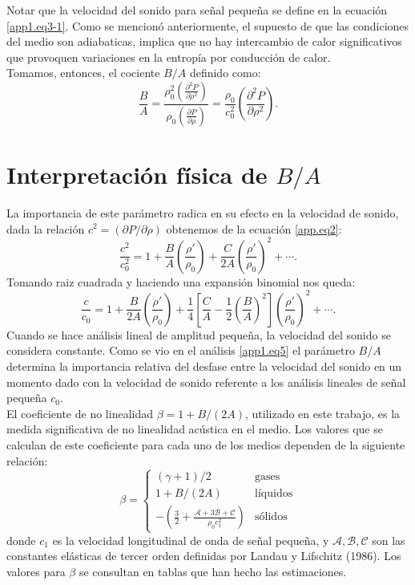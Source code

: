 Notar que la velocidad del sonido para señal pequeña se define en la ecuación \eqref{app1.eq3-1}. Como se mencionó anteriormente, el supuesto de que las condiciones del medio son adiabaticas, implica que no hay intercambio de calor significativos que provoquen variaciones en la entropía por conducción de calor. \medskip\\
Tomamos, entonces, el cociente $B\slash A$ definido como:
\begin{equation*}
\frac{B}{A}  = \frac{\rho_0^2\left( \frac{\partial^2 P}{\partial \rho^2}\right)}{\rho_0\left( \frac{\partial P}{\partial \rho}\right)} = \frac{\rho_0}{c_0^2}\left( \frac{\partial^2 P}{\partial \rho^2}\right)\text{.}
\end{equation*}
\section{Interpretación física de $B\slash A$}
La importancia de este parámetro radica en su efecto en la velocidad de sonido, dada la relación $c^2 = (\partial P\slash \partial \rho)$ obtenemos de la ecuación \eqref{app.eq2}:
\begin{equation}
\frac{c^2}{c_0^2} = 1 + \frac{B}{A}\left(\frac{\rho'}{\rho_0}\right) + \frac{C}{2A}\left(\frac{\rho'}{\rho_0}\right)^2+ \cdots \label{app1.eq4}\text{.}
\end{equation}
Tomando raiz cuadrada y haciendo una expansión binomial nos queda: 
\begin{equation}
\frac{c}{c_0} = 1 + \frac{B}{2A}\left(\frac{\rho'}{\rho_0}\right) + \frac{1}{4}\left[ \frac{C}{A} - \frac{1}{2}\left(\frac{B}{A} \right)^2 \right]\left(\frac{\rho'}{\rho_0}\right)^2 + \cdots \label{app1.eq5}\text{.}
\end{equation}
Cuando se hace análisis lineal de amplitud pequeña, la velocidad del sonido se considera constante. Como se vio en el análisis \eqref{app1.eq5} el parámetro $B\slash A$ determina la importancia relativa del desfase entre la velocidad del sonido en un momento dado con la velocidad de sonido referente a los análisis lineales de señal pequeña $c_0$.\medskip\\
El coeficiente de no linealidad $\beta = 1 + B\slash (2A)$, utilizado en este trabajo, es la medida significativa de no linealidad acústica en el medio. Los valores que se calculan de este coeficiente para cada uno de los medios dependen de la siguiente relación:
\begin{equation}
\displaystyle\beta = \left\lbrace
\begin{matrix}
(\gamma + 1)\slash2 & \text{gases} \\
1 + B\slash (2A) & \text{líquidos}\\
-\left( \frac{3}{2} + \frac{\mathcal{A} + 3\mathcal{B} + \mathcal{C}}{\rho_0 c_1^2}\right) & \text{sólidos}
\end{matrix}
\right.
\end{equation}
donde $c_1$ es la velocidad longitudinal de onda de señal pequeña, y $\mathcal{A},\mathcal{B}, \mathcal{C}$ son las constantes elásticas de tercer orden definidas por Landau y Lifschitz (1986)\cite{nonlinear}. Los valores para $\beta$ se consultan en tablas que han hecho las estimaciones. 